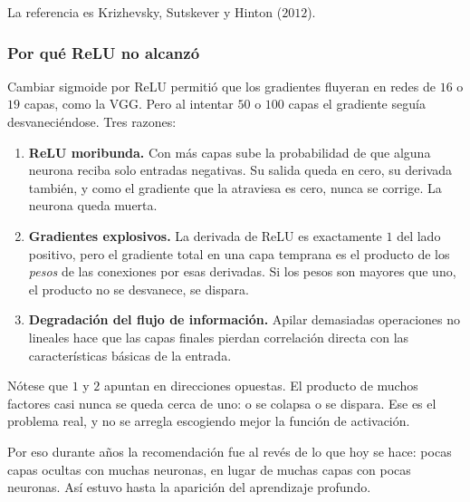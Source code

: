 \documentclass[11pt,letterpaper]{article}
\begin{document}
La referencia es Krizhevsky, Sutskever y Hinton ($2012$).

\subsubsection*{Por qué ReLU no alcanzó}

Cambiar sigmoide por ReLU permitió que los gradientes fluyeran en
redes de $16$ o $19$ capas, como la VGG. Pero al intentar $50$ o $100$
capas el gradiente seguía desvaneciéndose. Tres razones:

\begin{enumerate}[itemsep=0.4em]
  \item \textbf{ReLU moribunda.} Con más capas sube la probabilidad de
        que alguna neurona reciba solo entradas negativas. Su salida
        queda en cero, su derivada también, y como el gradiente que la
        atraviesa es cero, nunca se corrige. La neurona queda muerta.
  \item \textbf{Gradientes explosivos.} La derivada de ReLU es
        exactamente $1$ del lado positivo, pero el gradiente total en
        una capa temprana es el producto de los \emph{pesos} de las
        conexiones por esas derivadas. Si los pesos son mayores que
        uno, el producto no se desvanece, se dispara.
  \item \textbf{Degradación del flujo de información.} Apilar
        demasiadas operaciones no lineales hace que las capas finales
        pierdan correlación directa con las características básicas de
        la entrada.
\end{enumerate}

\begin{ojo}
  Nótese que $1$ y $2$ apuntan en direcciones opuestas. El producto de
  muchos factores casi nunca se queda cerca de uno: o se colapsa o se
  dispara. Ese es el problema real, y no se arregla escogiendo mejor
  la función de activación.
\end{ojo}

Por eso durante años la recomendación fue al revés de lo que hoy se
hace: pocas capas ocultas con muchas neuronas, en lugar de muchas
capas con pocas neuronas. Así estuvo hasta la aparición del
aprendizaje profundo.


\newpage

\end{document}
